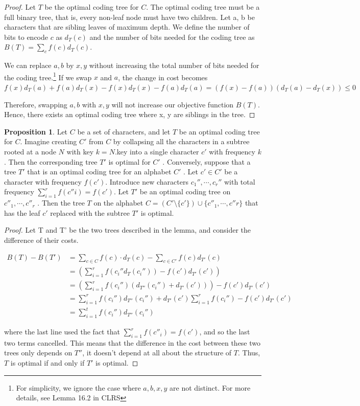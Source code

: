 \documentclass [12pt]{article}
\theoremstyle{definition}
\newtheorem{proposition}{Proposition}
\begin{document}
\begin{proof}
Let $T$ be the optimal coding tree for $C$. The optimal coding tree must be a full binary
tree, that is, every non-leaf node must have two children. Let a, b be characters that are
sibling leaves of maximum depth. We define the number of bits to encode $c$ as $d_T (c)$ and
the number of bits needed for the coding tree as $B(T) = \sum_c f(c)d_T(c)$.

We can replace $a, b$ by $x, y$ without increasing the total number of bits needed for the coding
tree.\footnote{For simplicity, we ignore the case where $a, b, x, y$ are not distinct. For more details, see Lemma 16.2 in CLRS} If we swap $x$ and $a$, the change in cost becomes $f (x)d_T (a) + f (a)d_T (x) - f (x)d_T (x) - f (a)d_T (a) = (f (x) - f (a))(d_T (a) - d_T (x)) \leq 0$

Therefore, swapping $a, b$ with $x, y$ will not increase our objective function $B(T)$. Hence, there exists an optimal coding tree where x, y are siblings in the tree.
\end{proof}

\begin{proposition} 
Let $C$ be a set of characters, and let $T$ be an optimal coding tree for $C$. Imagine creating $C'$ from $C$ by collapsing all the characters in a subtree rooted at a node $N$ with key $k = N$.key into a single character $c'$ with frequency $k$. Then the corresponding tree $T'$ is optimal for $C'$ . Conversely, suppose that a tree $T'$ that is an optimal coding tree for an alphabet $C'$ . Let $c'\in C'$ be a character with frequency $f (c')$. Introduce new characters $c_1'' , \cdots , c_r''$ with total frequency $\sum^{r}_{i=1} f (c''i ) = f (c')$. Let $T'$ be an optimal coding tree on $c''_1 , \cdots , c''_r$ . Then the tree $T$ on the alphabet $C = (C'\setminus \{c'\}) \cup \{c''_1 , \cdots , c''r \}$ that has the leaf $c'$ replaced with the subtree $T'$ is optimal.
\end{proposition}


\begin{proof}
Let T and T' be the two trees described in the lemma, and consider the difference of their costs.

\begin{align*}
B(T) - B(T') &= \sum_{c\in C} f(c) \cdot d_T(c) - \sum_{c \in C'} f(c) d_{T'}(c) \\
&= \left(\sum_{i=1}^r f(c_i'' d_T(c_i'')) - f(c')d_{T'}(c') \right) \\
&= \left(\sum_{i=1}^r f(c_i'')(d_{T''}(c_i'') + d_{T'}(c'))\right) - f(c')d_{T'}(c') \\
&= \sum_{i=1}^{r} f(c_i'')d_{T''}(c_i'') + d_{T'}(c')\sum_{i=1}^r f(c_i'') - f(c')d_{T'}(c') \\
&= \sum_{i=1}^t f(c_i'')d_{T''}(c_i'')
\end{align*} 

where the last line used the fact that $\sum^{r}_{i=1} f (c ''_i ) = f (c ' )$, and so the last two terms cancelled. This means that the difference in the cost between these two trees only depends on $T''$, it doesn't depend at all about the structure of $T$. Thus, $T$ is optimal if and only if $T'$ is optimal.
\end{proof}
\end{document}

